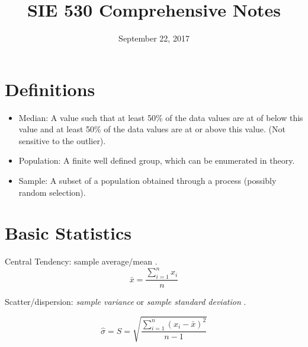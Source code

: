 \documentclass[12pt]{article}
\begin{document}
\title{SIE 530 Comprehensive Notes}
\date{September 22, 2017}
\maketitle

\section*{Definitions}

\begin{itemize}

\item Median: A value such that at least 50\% of the data values are at of below this value and at least 50\% of the data values are at or above this value. (Not sensitive to the outlier). \cite[p.9]{classnotes.1}

\item Population: A finite well defined group, which can be enumerated in theory. \cite[p.9]{classnotes.1}

\item Sample: A subset of a population obtained through a process (possibly random selection). \cite[p.9]{classnotes.1}

\end{itemize}

\newpage

\section*{Basic Statistics}

Central Tendency: sample average/mean \cite[p.14]{classnotes.1}.
$$\bar{x}=\frac{\sum_{i=1}^n x_i}{n}$$

Scatter/dispersion: \emph{sample variance} or \emph{sample standard deviation} \cite[p.14]{classnotes.1}.

$$ \hat{\sigma}=S=\sqrt{\frac{\sum_{i=1}^n(x_i-\bar{x})^2}{n-1}} $$

\newpage


\end{document}
